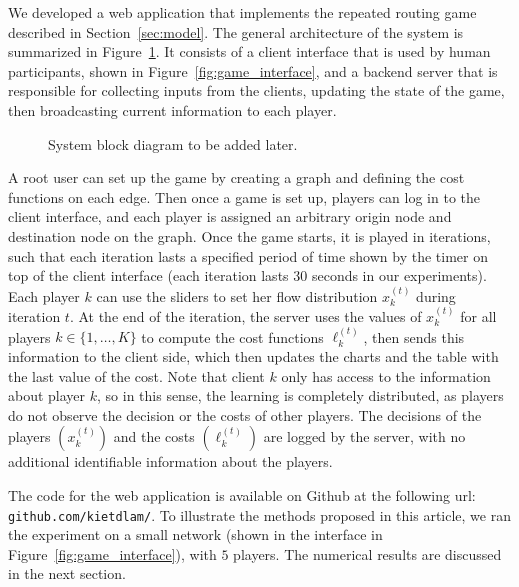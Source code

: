\documentclass{sig-alternate-ipsn13}
\begin{document}
We developed a web application that implements the repeated routing game described in Section~\ref{sec:model}. The general architecture of the system is summarized in Figure~\ref{fig:system_block_diagram}. It consists of a client interface that is used by human participants, shown in Figure~\ref{fig:game_interface}, and a backend server that is responsible for collecting inputs from the clients, updating the state of the game, then broadcasting current information to each player. 

\begin{figure}[h]
  \centering
  \caption{\footnotesize System block diagram to be added later.}
  \label{fig:system_block_diagram}
\end{figure}


A root user can set up the game by creating a graph and defining the cost functions on each edge. Then once a game is set up, players can log in to the client interface, and each player is assigned an arbitrary origin node and destination node on the graph. Once the game starts, it is played in iterations, such that each iteration lasts a specified period of time shown by the timer on top of the client interface (each iteration lasts $30$ seconds in our experiments). Each player $k$ can use the sliders to set her flow distribution $x^{(t)}_k$ during iteration $t$. At the end of the iteration, the server uses the values of $x_k^{(t)}$ for all players $k \in \{1, \dots, K\}$ to compute the cost functions $\ell^{(t)}_k$, then sends this information to the client side, which then updates the charts and the table with the last value of the cost. Note that client $k$ only has access to the information about player $k$, so in this sense, the learning is completely distributed, as players do not observe the decision or the costs of other players. The decisions of the players $(x_k^{(t)})$ and the costs $(\ell^{(t)}_k)$ are logged by the server, with no additional identifiable information about the players.

The code for the web application is available on Github at the following url: \texttt{github.com/kietdlam/}. To illustrate the methods proposed in this article, we ran the experiment on a small network (shown in the interface in Figure~\ref{fig:game_interface}), with $5$ players. The numerical results are discussed in the next section.



\end{document}
